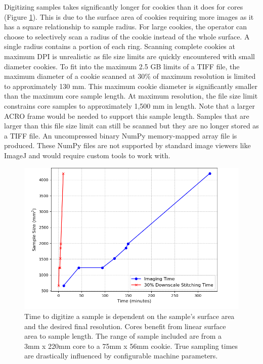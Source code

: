 \documentclass[a4paper,12pt]{article}
\begin{document}
Digitizing samples takes significantly longer for cookies than it does for cores (Figure \ref{fig:digitization_time}). This is due to the surface area of cookies requiring more images as it has a square relationship to sample radius.
For large cookies, the operator can choose to selectively scan a radius of the cookie instead of the whole surface. A single radius contains a portion of each ring. Scanning complete cookies at maximum DPI is unrealistic as file size limits are quickly encountered with small diameter cookies. 
To fit into the maximum 2.5 GB limits of a TIFF file, the maximum diameter of a cookie scanned at 30\% of maximum resolution is limited to approximately 130 mm. This maximum cookie diameter is significantly smaller than the maximum core sample length. At maximum resolution, the file size limit 
constrains core samples to approximately 1,500 mm in length. Note that a larger ACRO frame would be needed to support this sample length. Samples that are larger than this file size limit can still be scanned but they are no longer stored as a TIFF file. 
An uncompressed binary NumPy memory-mapped array file is produced. These NumPy files are not supported by standard image viewers like ImageJ and would require custom tools to work with. 

\begin{figure}
    \centering
    \includegraphics[height=0.5\linewidth]{../../code/plots/time_and_area.png}
    \caption{Time to digitize a sample is dependent on the sample's surface area and the desired final resolution.
    Cores benefit from linear surface area to sample length. The range of sample included are from a 3mm x 220mm core to a 75mm x 56mm cookie. True sampling times are drastically influenced by configurable machine parameters.} %
    \label{fig:digitization_time}
\end{figure}
\end{document}
